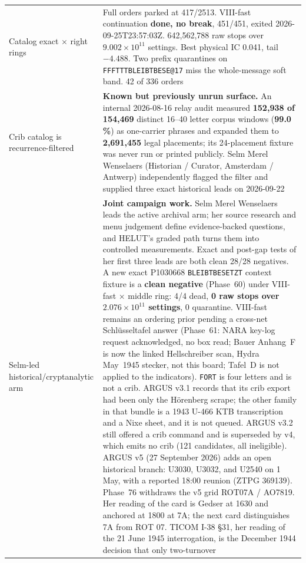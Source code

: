 \documentclass[11pt,a4paper]{article}
\begin{document}
{\begin{longtable}{@{}p{}p{}@{}}
Catalog exact $\times$ right rings & Full orders parked at 417/2513. VIII-fast continuation \textbf{done, no break}, 451/451, exited 2026-09-25T23:57:03Z. 642{,}562{,}788 raw stops over $9.002\times10^{11}$ settings. Best physical IC 0.041, tail $-4.488$. Two prefix quarantines on \texttt{FFFTTTBLEIBTBESE@17} miss the whole-message soft band. 42 of 336 orders \\
Crib catalog is recurrence-filtered & \textbf{Known but previously unrun surface.} An internal
  2026-08-16 relay audit measured \textbf{152{,}938 of 154{,}469} distinct 16--40 letter
  corpus windows (\textbf{99.0\,\%}) as one-carrier phrases and expanded them to
  \textbf{2{,}691{,}455} legal placements; its 24-placement fixture was never run or printed
  publicly. Selm Merel Wenselaers (Historian / Curator, Amsterdam / Antwerp) independently
  flagged the filter and supplied three exact historical leads on 2026-09-22 \\
Selm-led historical/cryptanalytic arm & \textbf{Joint campaign work.} Selm Merel Wenselaers
  leads the active archival arm; her source research and menu judgement define evidence-backed
  questions, and HELUT's graded path turns them into controlled measurements. Exact and post-gap
  tests of her first three leads are both clean 28/28 negatives. A new exact P1030668
  \texttt{BLEIBTBESETZT} context fixture is a \textbf{clean negative} (Phase~60)
  under VIII-fast $\times$ middle ring: 4/4 dead, \textbf{0 raw stops over
  $2.076\times10^{11}$ settings}, 0 quarantine. VIII-fast remains an ordering
  prior pending a cross-net Schlüsseltafel answer (Phase~61: NARA key-log
  request acknowledged, no box read; Bauer Anhang~F is now the linked
  Hellschreiber scan, Hydra May~1945 stecker, not this board; Tafel~D is not
  applied to the indicators). \texttt{FORT} is four letters and is not a crib.
  ARGUS v3.1 records that its crib export had been only the Hörenberg scrape;
  the other family in that bundle is a 1943 U-466 KTB transcription and a Nixe
  sheet, and it is not queued. ARGUS v3.2 still offered a crib command and is
  superseded by v4, which emits no crib (121 candidates, all ineligible).
  ARGUS v5 (27 September 2026) adds an open historical branch: U3030, U3032,
  and U2540 on 1 May, with a reported 18:00 reunion (ZTPG 369139).
  Phase~76 withdraws the v5 grid ROT07A / AO7819. Her reading of the card
  is Gedser at 1630 and anchored at 1800 at 7A; the next card distinguishes
  7A from ROT 07. TICOM I-38 \S31, her reading of the 21 June 1945
  interrogation, is the December 1944 decision that only two-turnover

\end{longtable}}
\end{document}
